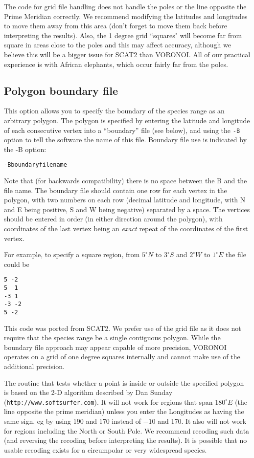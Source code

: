 \documentclass[10pt,titlepage,times,letterpaper]{article}
\begin{document}
The code for grid file handling does not handle the poles or the line opposite the Prime Meridian 
correctly.  We recommend modifying the latitudes and longitudes to move them away from this 
area (don't forget to move them back before interpreting the results).  Also, the 1 degree grid 
``squares" will become far from square in areas close to the poles and this may affect accuracy, although 
we believe this will be a bigger issue for SCAT2 than VORONOI.  All of our practical experience is
with African elephants, which occur fairly far from the poles.


\subsection{Polygon boundary file}

This option allows you to specify the boundary of the species range as an arbitrary 
polygon.  The polygon is specified by entering the latitude and longitude of
each consecutive vertex into a ``boundary'' file (see below), and using
the {\tt -B} option to tell the software the name of this file.
Boundary file use is indicated by the -B option:

{\tt -Bboundaryfilename}

Note that (for backwards compatibility) there is no space between the B and the file name.
The boundary file should contain one row for each vertex in the
polygon, with two numbers on each row (decimal latitude and longitude,
with N and E being positive, S and W being negative) separated by a
space. The vertices should be entered in order (in either direction
around the polygon), with coordinates of the last vertex being an {\it
exact} repeat of the coordinates of the first vertex.

For example, to specify a square region, from $5^\circ N$ to $3^\circ S$ and
$2^\circ W$ to $1^\circ E$ the file could be
\begin{verbatim}
5 -2
5  1
-3 1
-3 -2
5 -2
\end{verbatim}

This code was ported from SCAT2.  We prefer use of the grid file as it does not
require that the species range be a single contiguous polygon.  While the boundary
file approach may appear capable of more precision, VORONOI operates on a grid of
one degree squares internally and cannot make use of the additional precision.

The routine that tests whether a point is inside or outside
the specified polygon is based on the 2-D algorithm 
described by Dan Sunday ({\tt http://www.softsurfer.com}). 
It will not work for regions that span
$180^\circ E$ (the line opposite the prime meridian) unless you enter
the Longitudes as having the same sign, eg by using $190$ and $170$
instead of $-10$ and $170$. It also will not work for regions
including the North or South Pole.   We recommend recoding such
data (and reversing the recoding before interpreting the results).  It
is possible that no usable recoding exists for a circumpolar or very widespread species.
\end{document}
